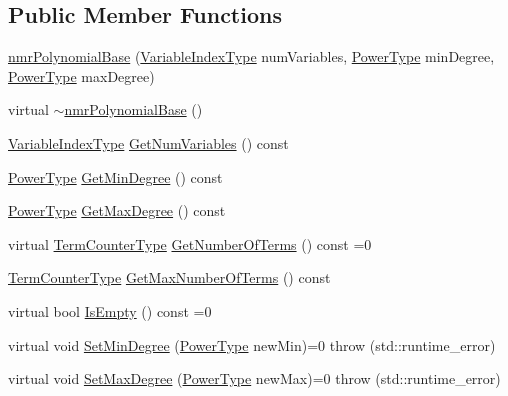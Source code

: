 \subsection*{Public Member Functions}
\begin{DoxyCompactItemize}
\item 
\hyperlink{classnmr_polynomial_base_afab6c489df6b895fd9b73561d0d6c04e}{nmr\+Polynomial\+Base} (\hyperlink{classnmr_polynomial_base_aae95477e451ddc7d3ee3f41cbdaadde2}{Variable\+Index\+Type} num\+Variables, \hyperlink{classnmr_polynomial_base_a58607c884bf2e6725a77ed4d9e14ba26}{Power\+Type} min\+Degree, \hyperlink{classnmr_polynomial_base_a58607c884bf2e6725a77ed4d9e14ba26}{Power\+Type} max\+Degree)
\item 
virtual \hyperlink{classnmr_polynomial_base_a11470f43d93f7857f903f42df6947922}{$\sim$nmr\+Polynomial\+Base} ()
\item 
\hyperlink{classnmr_polynomial_base_aae95477e451ddc7d3ee3f41cbdaadde2}{Variable\+Index\+Type} \hyperlink{classnmr_polynomial_base_a28d1473098dd14dd2463581ed65c8c6c}{Get\+Num\+Variables} () const 
\item 
\hyperlink{classnmr_polynomial_base_a58607c884bf2e6725a77ed4d9e14ba26}{Power\+Type} \hyperlink{classnmr_polynomial_base_a3ac2485119d1196e61c7b46935b4b531}{Get\+Min\+Degree} () const 
\item 
\hyperlink{classnmr_polynomial_base_a58607c884bf2e6725a77ed4d9e14ba26}{Power\+Type} \hyperlink{classnmr_polynomial_base_aae62bf8006242c1ec1b6e394104b479e}{Get\+Max\+Degree} () const 
\item 
virtual \hyperlink{classnmr_polynomial_base_a4b0abd66b12b6f5bfb30d0eb1607e661}{Term\+Counter\+Type} \hyperlink{classnmr_polynomial_base_a69f1c0053d6ee20693ea719d32a159ee}{Get\+Number\+Of\+Terms} () const =0
\item 
\hyperlink{classnmr_polynomial_base_a4b0abd66b12b6f5bfb30d0eb1607e661}{Term\+Counter\+Type} \hyperlink{classnmr_polynomial_base_af5e9c5ce95676316e011aaeb765bfe8f}{Get\+Max\+Number\+Of\+Terms} () const 
\item 
virtual bool \hyperlink{classnmr_polynomial_base_abd683b694cb97b6cffc95752258a65ba}{Is\+Empty} () const =0
\item 
virtual void \hyperlink{classnmr_polynomial_base_af36d01115bacbb1d8aced67d56cae75b}{Set\+Min\+Degree} (\hyperlink{classnmr_polynomial_base_a58607c884bf2e6725a77ed4d9e14ba26}{Power\+Type} new\+Min)=0  throw (std\+::runtime\+\_\+error)
\item 
virtual void \hyperlink{classnmr_polynomial_base_ab6bd189c5aa67120857a93c6d93ff1b3}{Set\+Max\+Degree} (\hyperlink{classnmr_polynomial_base_a58607c884bf2e6725a77ed4d9e14ba26}{Power\+Type} new\+Max)=0  throw (std\+::runtime\+\_\+error)

\end{DoxyCompactItemize}
